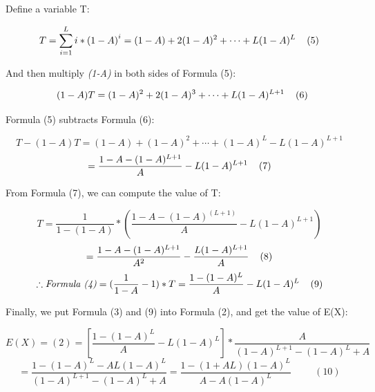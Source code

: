 \documentclass{sig-alternate}
\begin{document}
  \normalsize
 \begin{spacing}{0.6}
Define a variable T: 
  \end{spacing}
\scriptsize 
  \[T = \sum_{i=1}^{L} i*{(1-A)}^{i} = (1-A)+ 2(1-A)^2+\cdots+ L(1-A)^L\hspace{0.4cm}(5)\] 
\normalsize
 \begin{spacing}{0.6}
And then multiply  \textit{(1-A)} in both sides of Formula (5):
  \end{spacing}
  \scriptsize 
  \[ \hspace{0.2cm} (1-A)T = (1-A)^2+ 2(1-A)^3+\cdots+ L(1-A)^{L+1}\hspace{0.4cm}(6)\] 
  \normalsize
 \begin{spacing}{1}
Formula (5) subtracts Formula (6):
  \end{spacing}
   \scriptsize 
  \[T- (1-A)T = (1-A)+ (1-A)^2+\cdots+ (1-A)^L - L(1-A)^{L+1}\] 
  \[= \frac{1-A-(1-A)^{L+1}}{A}- L(1-A)^{L+1}\hspace{0.4cm}(7)\] 
  \normalsize
 \begin{spacing}{1}
From Formula (7), we can compute the value of T:
  \end{spacing}
   \scriptsize 
    \begin{spacing}{0.6}
  \[T = \frac{1}{1-(1-A)}*(\frac{1-A-(1-A)^(L+1)}{A} - L(1-A)^{L+1})\] 
  \[ = \frac{1-A-(1-A)^{L+1}}{A^2} - \frac{L(1-A)^{L+1}}{A}\hspace{0.4cm}(8)\] 
   \[\therefore \textit{Formula (4)} = (\frac{1}{1-A}-1)*T = \frac{1-(1-A)^L}{A}- L(1-A)^L\hspace{0.4cm}(9)\] 
  \end{spacing}
   
  \normalsize
   \begin{spacing}{1.2}
Finally, we put Formula (3) and (9) into Formula (2), and get the value of E(X):
      \end{spacing}
   \scriptsize 
   \begin{spacing}{0.6}
  \[E(X) = (2) = [\frac{1-(1-A)^{L}}{A} - L(1-A)^L]*\frac{A}{(1-A)^{L+1} - (1-A)^L+A}\] 
  \[= \frac{1-(1-A)^L-AL(1-A)^L}{(1-A)^{L+1}-(1-A)^L+A}= \frac{1-(1+AL)(1-A)^L}{A-A(1-A)^L}  \hspace{1cm}(10)\] 
  \end{spacing}
  \normalsize
\end{document}
